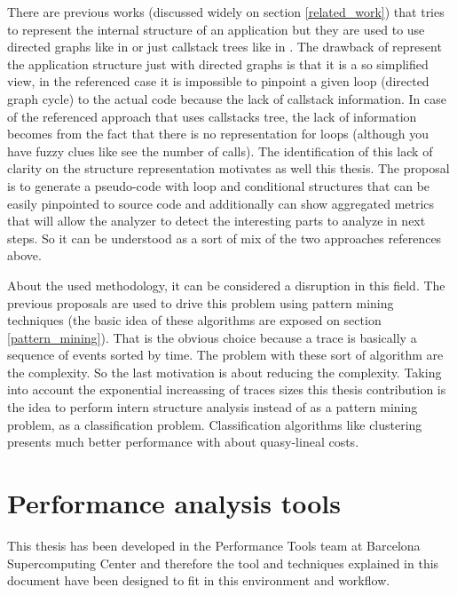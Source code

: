 There are previous works (discussed widely on section \ref{related_work})  that 
tries to represent the internal structure of an application but they are used to
use directed graphs like in \cite{aguilar2016event} or just callstack trees like
in \cite{saviankou2015cube}. The drawback of represent the application structure
just with directed graphs is that it is a so simplified view, in the referenced
case it is impossible to pinpoint a given loop (directed graph cycle) to the
actual code because the lack of callstack information. In case of the
referenced approach that uses callstacks tree, the lack of information becomes
from the fact that there is no representation for loops (although you have fuzzy
clues like see the number of calls). The identification of this lack of clarity
on the structure representation motivates as well this thesis. The proposal is to 
generate a pseudo-code with loop and conditional structures that can be easily 
pinpointed to source code and additionally can show aggregated metrics
that will allow the analyzer to detect the interesting parts to analyze in next
steps. So it can be understood as a sort of mix of the two approaches references
above.

About the used methodology, it can be considered a disruption in this field. The
previous proposals are used to drive this problem using pattern mining
techniques (the basic idea of these algorithms are exposed on section
\ref{pattern_mining}). That is the obvious choice because a trace is basically a
sequence of events sorted by time. The problem with these sort of algorithm are
the complexity. So the last motivation is about reducing the complexity. 
Taking into account the exponential increassing of traces sizes 
this thesis contribution is the idea to perform intern structure analysis 
instead of as a pattern mining problem, as a classification problem. 
Classification algorithms like clustering presents much better performance with 
about quasy-lineal costs.

\section{Performance analysis tools}\label{s:pt_evironment}

This thesis has been developed in the Performance Tools team at Barcelona
Supercomputing Center and therefore the tool and techniques explained in this
document have been designed to fit in this environment and workflow. 

